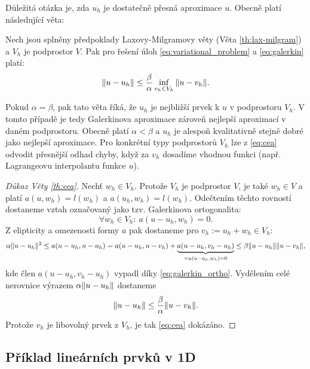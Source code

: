 Důležitá otázka je, zda $u_h$ je dostatečně přesná aproximace $u$.
Obecně platí následující věta:
\begin{veta}\label{th:cea}
Nech jsou splněny předpoklady Laxovy-Milgramovy věty (Věta \ref{th:lax-milgram}) a $V_h$ je podprostor $V$.
Pak pro řešení úloh \eqref{eq:variational_problem} a \eqref{eq:galerkin} platí:
\begin{equation}\label{eq:cea}
\|u-u_h\|\le\frac\beta\alpha\inf_{v_h\in V_h} \|u-v_h\|.
\end{equation}
\end{veta}

Pokud $\alpha=\beta$, pak tato věta říká, že $u_h$ je nejbližší prvek k $u$ v podprostoru $V_h$.
V tomto případě je tedy Galerkinova aproximace zároveň nejlepší aproximací v daném podprostoru.
Obecně platí $\alpha<\beta$ a $u_h$ je alespoň kvalitativně stejně dobré jako nejlepší aproximace.
Pro konkrétní typy podprostorů $V_h$ lze z \eqref{eq:cea} odvodit přesnější odhad chyby, když za $v_h$ dosadíme vhodnou funkci (např. Lagrangeovu interpolantu funkce $u$).

\begin{proof}[Důkaz Věty \ref{th:cea}]
Nechť $w_h\in V_h$. Protože $V_h$ je podprostor $V$, je také $w_h\in V$ a platí $a(u,w_h) = l(w_h)$ a $a(u_h,w_h)=l(w_h)$.
Odečtením těchto rovností dostaneme vztah označovaný jako tzv. Galerkinova ortogonalita:
\begin{equation}\label{eq:galerkin_ortho}
\forall w_h\in V_h:~a(u-u_h,w_h)=0.
\end{equation}
Z elipticity a omezenosti formy $a$ pak dostaneme pro $v_h:=u_h+w_h\in V_h$:
\[ \alpha\|u-u_h\|^2 \le a(u-u_h,u-u_h) = a(u-u_h,u-v_h) + \underbrace{a(u-u_h,v_h-u_h)}_{=a(u-u_h,w_h)=0} \le \beta\|u-u_h\|\|u-v_h\|, \]
kde člen $a(u-u_h,v_h-u_h)$ vypadl díky \eqref{eq:galerkin_ortho}.
Vydělením celé nerovnice výrazem $\alpha\|u-u_h\|$ dostaneme
\[ \|u-u_h\| \le \frac\beta\alpha\|u-v_h\|. \]
Protože $v_h$ je libovolný prvek z $V_h$, je tak \eqref{eq:cea} dokázáno.
\end{proof}


\subsection{Příklad lineárních prvků v 1D}

